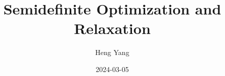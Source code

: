 \documentclass[
]{book}
\title{Semidefinite Optimization and Relaxation}
\author{Heng Yang}
\date{2024-03-05}
\theoremstyle{definition}
\theoremstyle{definition}
\theoremstyle{definition}
\theoremstyle{definition}
\theoremstyle{remark}
\begin{document}
\maketitle

{
\setcounter{tocdepth}{1}
\tableofcontents
}
\newcommand{\calG}{\mathcal{G}}
\newcommand{\calV}{\mathcal{V}}
\newcommand{\calE}{\mathcal{E}}
\newcommand{\calF}{\mathcal{F}}
\newcommand{\calQ}{\mathcal{Q}}
\newcommand{\calA}{\mathcal{A}}
\newcommand{\calK}{\mathcal{K}}
\newcommand{\calS}{\mathcal{S}}
\newcommand{\calM}{\mathcal{M}}
\newcommand{\calI}{\mathcal{I}}
\newcommand{\mathx}{\mathrm{x}}
\newcommand{\mathy}{\mathrm{y}}
\newcommand{\bbE}{\mathbb{E}}
\newcommand{\calN}{\mathcal{N}}
\newcommand{\tldR}{\tilde{R}}
\newcommand{\bbZ}{\mathbb{Z}}
\newcommand{\bbQ}{\mathbb{Q}}
\newcommand{\bbC}{\mathbb{C}}
\newcommand{\bbF}{\mathbb{F}}
\newcommand{\bbR}{\mathbb{R}}

\newcommand{\Real}[1]{\mathbb{R}^{#1}}
\newcommand{\Comp}[1]{\mathbb{C}^{#1}}
\newcommand{\sym}[1]{\mathbb{S}^{#1}}
\newcommand{\psd}[1]{\sym{#1}_{+}}
\newcommand{\pd}[1]{\sym{#1}_{++}}
\newcommand{\inprod}[2]{\langle #1, #2 \rangle}
\newcommand{\linprod}[2]{\left\langle #1, #2 \right\rangle}
\newcommand{\trace}{\mathrm{tr}}
\newcommand{\tran}{^\top}

\newcommand{\rank}{\mathrm{rank}}
\newcommand{\diag}{\mathrm{diag}}
\newcommand{\Diag}{\mathrm{Diag}}
\newcommand{\BlkDiag}{\mathrm{BlkDiag}}
\newcommand{\vectorize}{\mathrm{vec}}
\newcommand{\svec}{\mathrm{svec}}
\newcommand{\mat}{\mathrm{mat}}
\newcommand{\smat}{\mathrm{smat}}
\newcommand{\norm}[1]{\Vert #1 \Vert}
\newcommand{\lnorm}[1]{\left\Vert #1 \right\Vert}
\newcommand{\pnorm}[2]{\Vert #1 \Vert_{#2}}
\newcommand{\Fnorm}[1]{\Vert #1 \Vert_\mathrm{F}}
\newcommand{\conv}{\mathrm{conv}}
\newcommand{\cone}{\mathrm{cone}}
\newcommand{\interior}{\mathrm{int}}
\newcommand{\relint}{\mathrm{ri}}
\newcommand{\poly}[1]{\mathbb{R}[#1]}
\newcommand{\SOd}{\mathrm{SO}(d)}
\newcommand{\SOthree}{\mathrm{SO}(3)}
\newcommand{\Od}{\mathrm{O}(d)}
\newcommand{\Ogroup}{\mathrm{O}}
\newcommand{\usphere}{\mathcal{S}}
\newcommand{\bmath}[1]{\boldsymbol{#1}}
\newcommand{\lbrkt}{[\![}
\newcommand{\rbrkt}{]\!]}
\newcommand{\brkt}[1]{\lbrkt #1 \rbrkt}
\newcommand{\bracket}[1]{[ #1 ]}
\newcommand{\sign}{\mathrm{sgn}}
\end{document}
